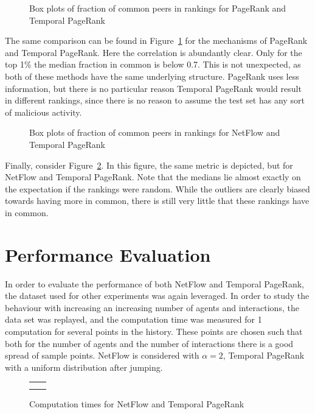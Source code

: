 \documentclass[a4paper,11pt]{book}
\theoremstyle{definition}
\begin{document}
\begin{figure}[ht]
    \centering
    
    \caption{Box plots of fraction of common peers in rankings for PageRank and Temporal PageRank}
    \label{fig:box_pr_tpr}
\end{figure}

The same comparison can be found in Figure~\ref{fig:box_pr_tpr} for the mechanisms of PageRank
and Temporal PageRank. Here the correlation is abundantly clear. Only for the top 1\% the
median fraction in common is below 0.7. This is not unexpected, as both of these methods
have the same underlying structure. PageRank uses less information, but there is no particular
reason Temporal PageRank would result in different rankings, since there is no reason to
assume the test set has any sort of malicious activity.

\begin{figure}[ht]
    \centering
    
    \caption{Box plots of fraction of common peers in rankings for NetFlow and Temporal PageRank}
    \label{fig:box_netflow_tpr}
\end{figure}

Finally, consider Figure~\ref{fig:box_netflow_tpr}. In this figure, the same metric is depicted, but
for NetFlow and Temporal PageRank. Note that the medians lie almost exactly on the expectation
if the rankings were random. While the outliers are clearly biased towards having more in common,
there is still very little that these rankings have in common.

\section{Performance Evaluation}

In order to evaluate the performance of both NetFlow and Temporal PageRank, the dataset used for
other experiments was again leveraged. In order to study the behaviour with increasing an increasing
number of agents and interactions, the data set was replayed, and the computation time was measured
for 1 computation for several points in the history. These points are chosen such that
both for the number of agents and the number of interactions there is a good spread of
sample points.
NetFlow is considered with $\alpha=2$, Temporal PageRank with a uniform
distribution after jumping. 

\begin{figure}[ht]
    \centering
    \begin{tabular}[ht]{cc}
         &
         \\
         &
         \\

    \end{tabular}
    \caption{Computation times for NetFlow and Temporal PageRank}
    \label{fig:performance}
\end{figure}
\end{document}
